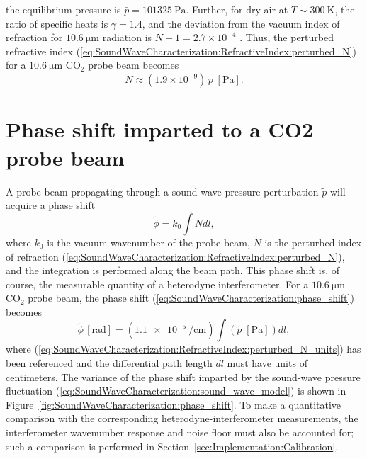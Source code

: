 the equilibrium pressure is $\bar{p} = \SI{101325}{\pascal}$.
Further, for dry air at $T \sim \SI{300}{\kelvin}$,
the ratio of specific heats is $\gamma = 1.4$, and
the deviation from the vacuum index of refraction
for $\SI{10.6}{\micro\meter}$ radiation is
$\bar{N} - 1 = 2.7 \times 10^{-4}$
\cite{marchetti_ipt06, mathar_N_IR_07, refractive_index_database}.
Thus, the perturbed refractive index
(\ref{eq:SoundWaveCharacterization:RefractiveIndex:perturbed_N})
for a $\SI{10.6}{\micro\meter}$ CO$_2$ probe beam becomes
\begin{equation}
  \tilde{N}
  \approx
  (1.9 \times 10^{-9})
  \,
  \tilde{p} \; [\text{Pa}].
  \label{eq:SoundWaveCharacterization:RefractiveIndex:perturbed_N_units}
\end{equation}


\section{Phase shift imparted to a CO2 probe beam}
\label{sec:SoundWaveCharacterization:PhaseShift}
A probe beam propagating through
a sound-wave pressure perturbation $\tilde{p}$
will acquire a phase shift
\begin{equation}
  \tilde{\phi}
  =
  k_0 \int \tilde{N} dl,
  \label{eq:SoundWaveCharacterization:phase_shift}
\end{equation}
where $k_0$ is the vacuum wavenumber of the probe beam,
$\tilde{N}$ is the perturbed index of refraction
(\ref{eq:SoundWaveCharacterization:RefractiveIndex:perturbed_N}), and
the integration is performed along the beam path.
This phase shift is, of course,
the measurable quantity of a heterodyne interferometer.
For a $\SI{10.6}{\micro\meter}$ CO$_2$ probe beam,
the phase shift (\ref{eq:SoundWaveCharacterization:phase_shift}) becomes
\begin{equation}
  \tilde{\phi} \, [\text{rad}]
  =
  (\SI{1.1e-5}{\per\centi\meter})
  \int
  (\tilde{p} \; [\text{Pa}])
  dl,
  \label{eq:SoundWaveCharacterization:phase_shift_units}
\end{equation}
where (\ref{eq:SoundWaveCharacterization:RefractiveIndex:perturbed_N_units})
has been referenced and
the differential path length $dl$ must have units of centimeters.
The variance of the phase shift imparted
by the sound-wave pressure fluctuation
(\ref{eq:SoundWaveCharacterization:sound_wave_model})
is shown in
Figure~\ref{fig:SoundWaveCharacterization:phase_shift}.
To make a quantitative comparison
with the corresponding heterodyne-interferometer measurements,
the interferometer wavenumber response and noise floor
must also be accounted for;
such a comparison is performed in
Section~\ref{sec:Implementation:Calibration}.

